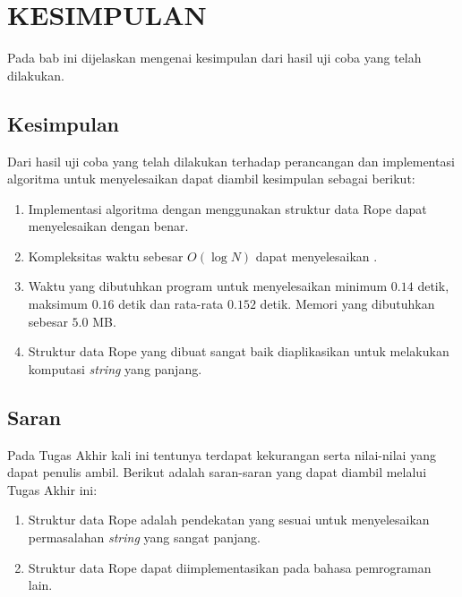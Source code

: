 \chapter{KESIMPULAN}

Pada bab ini dijelaskan mengenai kesimpulan dari hasil uji coba yang telah dilakukan.

\section{Kesimpulan}

Dari hasil uji coba yang telah dilakukan terhadap perancangan dan implementasi algoritma untuk menyelesaikan \problem{} dapat diambil kesimpulan sebagai berikut:

\begin{enumerate}
	\item Implementasi algoritma dengan menggunakan struktur data Rope dapat menyelesaikan \problem{} dengan benar. 
	\item Kompleksitas waktu sebesar $O(\log N)$ dapat menyelesaikan \problem{}.
	\item Waktu yang dibutuhkan program untuk menyelesaikan \problem{} minimum $0.14$ detik, maksimum $0.16$ detik dan rata-rata $0.152$ detik. Memori yang dibutuhkan sebesar $5.0$ MB.
	\item Struktur data Rope yang dibuat sangat baik diaplikasikan untuk melakukan komputasi \textit{string} yang panjang.
\end{enumerate}

\section{Saran}

Pada Tugas Akhir kali ini tentunya terdapat kekurangan serta nilai-nilai yang dapat penulis ambil. Berikut adalah saran-saran yang dapat diambil melalui Tugas Akhir ini:

\begin{enumerate}
	\item Struktur data Rope adalah pendekatan yang sesuai untuk menyelesaikan permasalahan \textit{string} yang sangat panjang.
	\item Struktur data Rope dapat diimplementasikan pada bahasa pemrograman lain.
\end{enumerate}